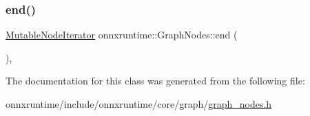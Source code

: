 \mbox{\label{classonnxruntime_1_1GraphNodes_a6f722ad93ac2141a7ea3d004f2e80da6}} 
\subsubsection{\texorpdfstring{end()}{end()}\hspace{0.1cm}{\footnotesize\ttfamily [2/2]}}
{\footnotesize\ttfamily \mbox{\hyperlink{classonnxruntime_1_1GraphNodes_ab5a670376171a0bc405018f0d6bb909d}{Mutable\+Node\+Iterator}} onnxruntime\+::\+Graph\+Nodes\+::end (\begin{DoxyParamCaption}{ }\end{DoxyParamCaption})\hspace{0.3cm}{\ttfamily [inline]}, {\ttfamily [noexcept]}}



The documentation for this class was generated from the following file\+:\begin{DoxyCompactItemize}
\item 
onnxruntime/include/onnxruntime/core/graph/\mbox{\hyperlink{graph__nodes_8h}{graph\+\_\+nodes.\+h}}\end{DoxyCompactItemize}
